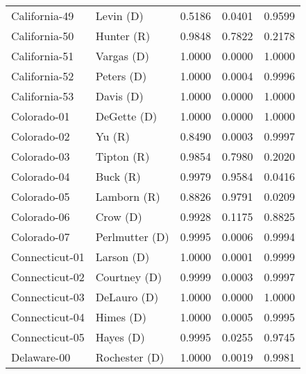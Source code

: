 \begin{longtable}{llrll}
     California-49 &           {\color{Blue} Levin (D)} &       0.5186 &        0.0401 &        0.9599 \\
     California-50 &           {\color{Red} Hunter (R)} &       0.9848 &        0.7822 &        0.2178 \\
     California-51 &          {\color{Blue} Vargas (D)} &       1.0000 &        0.0000 &        1.0000 \\
     California-52 &          {\color{Blue} Peters (D)} &       1.0000 &        0.0004 &        0.9996 \\
     California-53 &           {\color{Blue} Davis (D)} &       1.0000 &        0.0000 &        1.0000 \\
       Colorado-01 &         {\color{Blue} DeGette (D)} &       1.0000 &        0.0000 &        1.0000 \\
       Colorado-02 &               {\color{Red} Yu (R)} &       0.8490 &        0.0003 &        0.9997 \\
       Colorado-03 &           {\color{Red} Tipton (R)} &       0.9854 &        0.7980 &        0.2020 \\
       Colorado-04 &             {\color{Red} Buck (R)} &       0.9979 &        0.9584 &        0.0416 \\
       Colorado-05 &          {\color{Red} Lamborn (R)} &       0.8826 &        0.9791 &        0.0209 \\
       Colorado-06 &            {\color{Blue} Crow (D)} &       0.9928 &        0.1175 &        0.8825 \\
       Colorado-07 &      {\color{Blue} Perlmutter (D)} &       0.9995 &        0.0006 &        0.9994 \\
    Connecticut-01 &          {\color{Blue} Larson (D)} &       1.0000 &        0.0001 &        0.9999 \\
    Connecticut-02 &        {\color{Blue} Courtney (D)} &       0.9999 &        0.0003 &        0.9997 \\
    Connecticut-03 &         {\color{Blue} DeLauro (D)} &       1.0000 &        0.0000 &        1.0000 \\
    Connecticut-04 &           {\color{Blue} Himes (D)} &       1.0000 &        0.0005 &        0.9995 \\
    Connecticut-05 &           {\color{Blue} Hayes (D)} &       0.9995 &        0.0255 &        0.9745 \\
       Delaware-00 &       {\color{Blue} Rochester (D)} &       1.0000 &        0.0019 &        0.9981 \\

\end{longtable}
